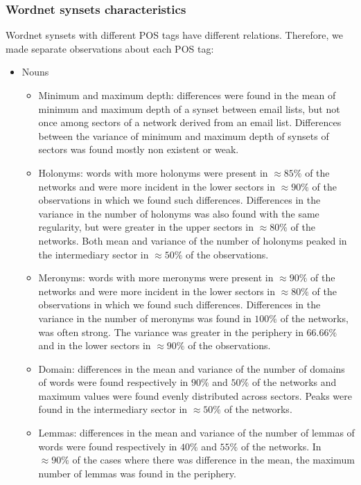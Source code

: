 \subsubsection{Wordnet synsets characteristics}\label{subsec:wn1}
Wordnet synsets with different POS tags have different relations.
Therefore, we made separate observations about each POS tag:
\begin{itemize}
	\item Nouns
		\begin{itemize}
			\item Minimum and maximum depth: 
				differences were found in the mean of minimum and maximum depth of a synset between email lists,
		but not once among sectors of a network derived from an email list.
		Differences between the variance of minimum and maximum depth of synsets of sectors was found mostly non existent or weak.
			\item Holonyms:
				words with more holonyms were present in $\approx 85\%$ of the networks and were
		more incident in the lower sectors in $\approx 90\%$ of the observations in which we found such differences.
		Differences in the variance in the number of holonyms was also found with the same regularity,
		but were greater in the upper sectors in $\approx 80\%$ of the networks.
				Both mean and variance of the number of holonyms peaked in the intermediary sector in $\approx50\%$ of the observations.
			\item Meronyms:
				words with more meronyms were present in $\approx 90\%$ of the networks and were
		more incident in the lower sectors in $\approx 80\%$ of the observations in which we found such differences.
			Differences in the variance in the number of meronyms was found in $100\%$ of the networks, was often strong.
				The variance was greater in the periphery in $66.66\%$ and in the lower sectors in $\approx 90\%$ of the observations.
			\item Domain:
				differences in the mean and variance of the number of domains of words were found respectively in $90\%$ and $50\%$ of the networks and maximum values were found evenly distributed across sectors.
				Peaks were found in the intermediary sector in $\approx 50\%$ of the networks.
			\item Lemmas:
				differences in the mean and variance of the number of lemmas of words were found respectively in $40\%$ and $55\%$ of the networks.
				In $\approx 90\%$ of the cases where there was difference in the mean, the maximum number of lemmas was found in the periphery.

\end{itemize}
\end{itemize}
